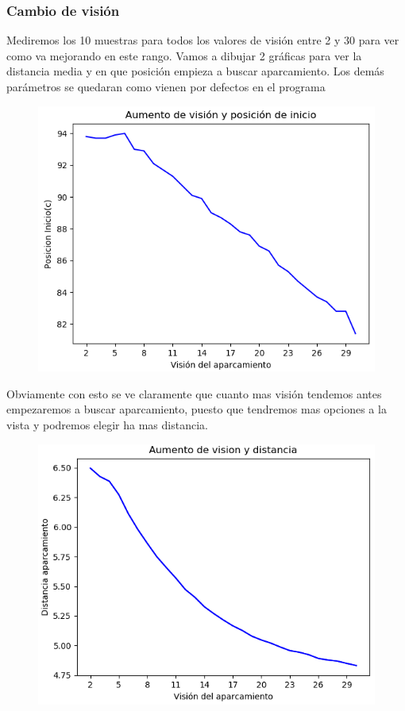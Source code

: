 \documentclass[]{article}
\begin{document}
\subsubsection{Cambio de visión}
Mediremos los 10 muestras para todos los valores de visión entre 2 y 30 para ver como va mejorando en este rango. Vamos a dibujar 2 gráficas para ver la distancia media y en que posición empieza a buscar aparcamiento. Los demás parámetros se quedaran como vienen por defectos en el programa

\begin{figure}[H]
	\centering
	\includegraphics[width=1\linewidth]{img/screenshot011}
	\caption{}
	\label{fig:screenshot011}
\end{figure}

Obviamente con esto se ve claramente que cuanto mas visión tendemos antes empezaremos a buscar aparcamiento, puesto que tendremos mas opciones a la vista y podremos elegir ha mas distancia.

\begin{figure}[H]
	\centering
	\includegraphics[width=1\linewidth]{img/screenshot008}
	\label{fig:screenshot008}
\end{figure}
\end{document}
